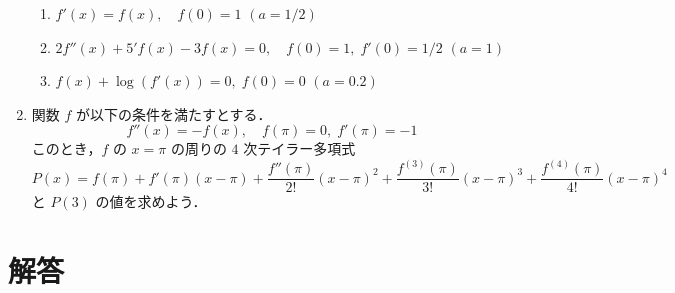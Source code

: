 \documentclass[11pt, uplatex, dvipdfmx, twoside]{jsarticle}
\newcommand{\ds}{\displaystyle}
\begin{document}
\begin{enumerate}[label=\arabic{section}.\arabic*]
  \vspace{1ex}

  \begin{enumerate}[label=(\arabic*)]

    \setlength{\itemsep}{1ex}
    
  \item $f'(x) = f(x), \quad f(0) =1$ \quad $\ds (a=1/2)$

  \item $\ds 2f''(x) +5'f(x) -3 f(x)=0, \quad f(0)=1, \; f'(0)= 1/2$ \quad $(a=1)$

  \item $\ds f(x) + \log\left( f'(x)\right) =0, \; f(0)=0$ \quad $(a=0.2)$
    
  \end{enumerate}

\item 関数 $f$ が以下の条件を満たすとする．
  \[
    f''(x) = -f(x), \quad f(\pi)=0, \; f'(\pi) = -1
  \]
  このとき，$f$ の $x=\pi$ の周りの $4$ 次テイラー多項式
  \[
    P(x) = f(\pi) + f'(\pi) (x-\pi) + \frac{f''(\pi)}{2!}(x-\pi)^2 + \frac{f^{(3)}(\pi)}{3!}(x-\pi)^3
    + \frac{f^{(4)}(\pi)}{4!}(x-\pi)^4
  \]
  と $P(3)$ の値を求めよう．
    
\end{enumerate}


\newpage


\section*{解答}
\end{document}
